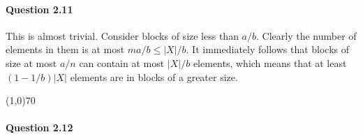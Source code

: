 \paragraph{Question 2.11} This is almost trivial. Consider blocks of size less than $a/b$. Clearly the number of elements in them is at most $ma/b\leq |X|/b$. It immediately follows that blocks of size at most $a/n$ can contain at most $|X|/b$ elements, which means that at least $(1-1/b)|X|$ elements are in blocks of a greater size.

\begin{center}
	\line(1,0){70}
\end{center}

\paragraph{Question 2.12}